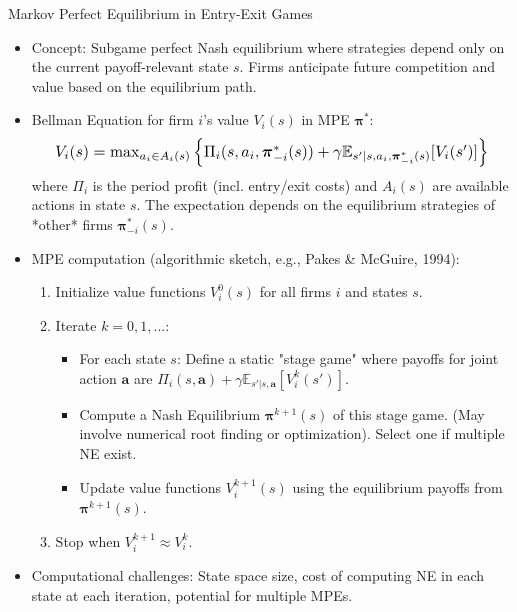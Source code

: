 \documentclass[10pt]{beamer}
\newcommand{\E}{\mathbb{E}}
\begin{document}

\begin{frame}{Markov Perfect Equilibrium in Entry-Exit Games}
    \begin{itemize}
        \item Concept: Subgame perfect Nash equilibrium where strategies depend only on the current payoff-relevant state $s$. Firms anticipate future competition and value based on the equilibrium path.
        \vspace{0.2cm}
        \item Bellman Equation for firm $i$'s value $V_i(s)$ in MPE $\boldsymbol{\pi}^*$:
         \begin{equation*}
         \resizebox{0.9\hsize}{!}{$
            V_i(s) = \max_{a_i \in A_i(s)} \left\{ \Pi_i(s, a_i, \boldsymbol{\pi}^*_{-i}(s)) + \gamma \E_{s'|s, a_i, \boldsymbol{\pi}^*_{-i}(s)} [V_i(s')] \right\}
         $}
         \end{equation*}
         where $\Pi_i$ is the period profit (incl. entry/exit costs) and $A_i(s)$ are available actions in state $s$. The expectation depends on the equilibrium strategies of *other* firms $\boldsymbol{\pi}^*_{-i}(s)$.
        \vspace{0.2cm}
        \item MPE computation (algorithmic sketch, e.g., Pakes & McGuire, 1994):
        \begin{enumerate}
            \item Initialize value functions $V_i^0(s)$ for all firms $i$ and states $s$.
            \item Iterate $k=0, 1, ...$:
            \begin{itemize}
                \item For each state $s$: Define a static "stage game" where payoffs for joint action $\mathbf{a}$ are $\Pi_i(s, \mathbf{a}) + \gamma \E_{s'|s, \mathbf{a}} [V_i^k(s')]$.
                \item Compute a Nash Equilibrium $\boldsymbol{\pi}^{k+1}(s)$ of this stage game. (May involve numerical root finding or optimization). Select one if multiple NE exist.
                \item Update value functions $V_i^{k+1}(s)$ using the equilibrium payoffs from $\boldsymbol{\pi}^{k+1}(s)$.
            \end{itemize}
            \item Stop when $V_i^{k+1} \approx V_i^k$.
        \end{enumerate}
        \vspace{0.2cm}
        \item Computational challenges: State space size, cost of computing NE in each state at each iteration, potential for multiple MPEs.
    \end{itemize}
\end{frame}
\end{document}
